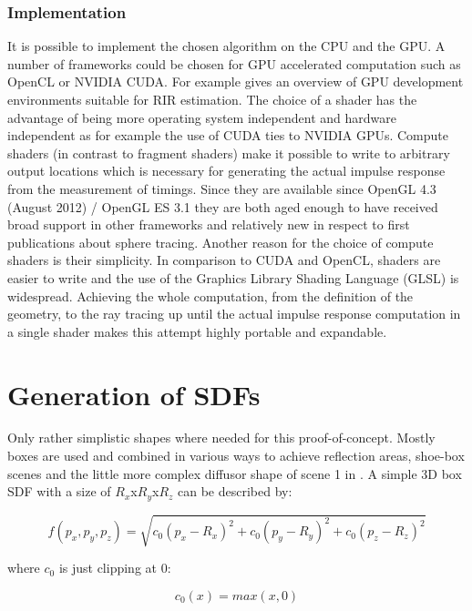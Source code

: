 \documentclass[twoside,a4paper]{article}
\begin{document}
\subsubsection{Implementation}
It is possible to implement the chosen algorithm on the CPU and the GPU. A number of frameworks could be chosen for GPU accelerated computation such as OpenCL or NVIDIA CUDA. For example \cite{stoltzfus_performance_2017} gives an overview of GPU development environments suitable for RIR estimation. The choice of a shader has the advantage of being more operating system independent and hardware independent as for example the use of CUDA ties to NVIDIA GPUs. Compute shaders (in contrast to fragment shaders) make it possible to write to arbitrary output locations which is necessary for generating the actual impulse response from the measurement of timings. Since they are available since OpenGL 4.3 (August 2012) / OpenGL ES 3.1 they are both aged enough to have received broad support in other frameworks and relatively new in respect to first publications about sphere tracing. Another reason for the choice of compute shaders is their simplicity. In comparison to CUDA and OpenCL, shaders are easier to write and the use of the Graphics Library Shading Language (GLSL) is widespread. Achieving the whole computation, from the definition of the geometry, to the ray tracing up until the actual impulse response computation in a single shader makes this attempt highly portable and expandable.

\section{Generation of SDFs}

Only rather simplistic shapes where needed for this proof-of-concept. Mostly boxes are used and combined in various ways to achieve reflection areas, shoe-box scenes and the little more complex diffusor shape of scene 1 in \cite{brinkmann_round_2019}. A simple 3D box SDF with a size of $R_x$x$R_y$x$R_z$ can be described by:

\begin{equation}
  f(p_x, p_y, p_z) = \sqrt{c_0(p_x - R_x)^2 + c_0(p_y - R_y)^2 + c_0(p_z - R_z)^2}
  \label{eq:eq1}
\end{equation}

where $c_0$ is just clipping at 0:

\begin{equation}
c_0(x) = max(x,0) 
\end{equation}
\end{document}
